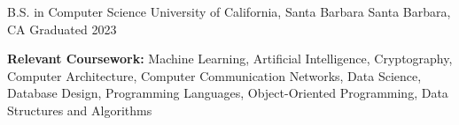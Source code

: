 \documentclass[12pt, letterpaper]{russell}
\begin{document}
\makecvheader

\vspace{-.6cm}


\begin{cventries}

  \cventry
    {B.S. in Computer Science} %
    {University of California, Santa Barbara} %
    {Santa Barbara, CA} %
    {Graduated 2023} %
    {
      \begin{cvitems} %
        \item {\textbf{Relevant Coursework:} Machine Learning, Artificial Intelligence, Cryptography, Computer Architecture, Computer Communication Networks, Data Science, Database Design, Programming Languages, Object-Oriented Programming, Data Structures and Algorithms}
      \end{cvitems}
    }

\end{cventries}

\vspace{-0.3cm}


\vspace{-0.2cm}
\end{document}
